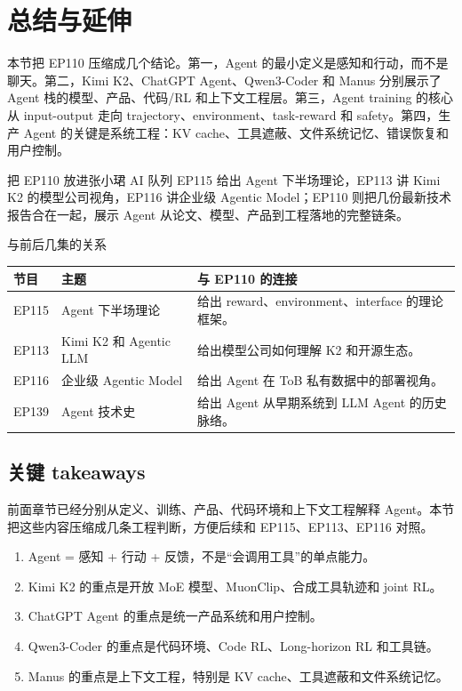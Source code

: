 \section{总结与延伸}

本节把 EP110 压缩成几个结论。第一，Agent 的最小定义是感知和行动，而不是聊天。第二，Kimi K2、ChatGPT Agent、Qwen3-Coder 和 Manus 分别展示了 Agent 栈的模型、产品、代码/RL 和上下文工程层。第三，Agent training 的核心从 input-output 走向 trajectory、environment、task-reward 和 safety。第四，生产 Agent 的关键是系统工程：KV cache、工具遮蔽、文件系统记忆、错误恢复和用户控制。

\begin{importantbox}{把 EP110 放进张小珺 AI 队列}
EP115 给出 Agent 下半场理论，EP113 讲 Kimi K2 的模型公司视角，EP116 讲企业级 Agentic Model；EP110 则把几份最新技术报告合在一起，展示 Agent 从论文、模型、产品到工程落地的完整链条。
\end{importantbox}

\begin{knowledgebox}{与前后几集的关系}
\begin{tabularx}{\textwidth}{p{}p{}X}
\toprule
节目 & 主题 & 与 EP110 的连接 \\
\midrule
EP115 & Agent 下半场理论 & 给出 reward、environment、interface 的理论框架。 \\
EP113 & Kimi K2 和 Agentic LLM & 给出模型公司如何理解 K2 和开源生态。 \\
EP116 & 企业级 Agentic Model & 给出 Agent 在 ToB 私有数据中的部署视角。 \\
EP139 & Agent 技术史 & 给出 Agent 从早期系统到 LLM Agent 的历史脉络。 \\
\bottomrule
\end{tabularx}
\end{knowledgebox}

\subsection{关键 takeaways}

前面章节已经分别从定义、训练、产品、代码环境和上下文工程解释 Agent。本节把这些内容压缩成几条工程判断，方便后续和 EP115、EP113、EP116 对照。

\begin{enumerate}
\item Agent = 感知 + 行动 + 反馈，不是“会调用工具”的单点能力。
\item Kimi K2 的重点是开放 MoE 模型、MuonClip、合成工具轨迹和 joint RL。
\item ChatGPT Agent 的重点是统一产品系统和用户控制。
\item Qwen3-Coder 的重点是代码环境、Code RL、Long-horizon RL 和工具链。
\item Manus 的重点是上下文工程，特别是 KV cache、工具遮蔽和文件系统记忆。
\end{enumerate}

